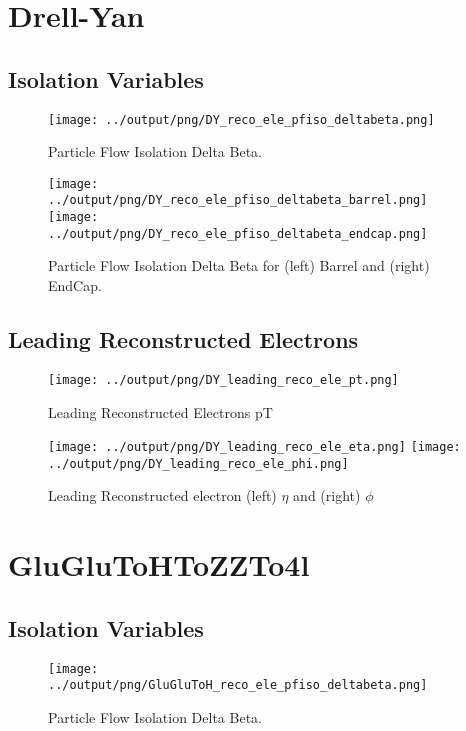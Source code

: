 \documentclass[11pt]{book}
\begin{document}
\clearpage

\chapter{Drell-Yan}
\section{Isolation Variables}
\begin{figure}[ht]
\centering
\texttt{[image: ../output/png/DY\_reco\_ele\_pfiso\_deltabeta.png]}
\caption{Particle Flow Isolation Delta Beta.}
\label{fig:dy_reco_ele_pfiso_deltabeta}
\end{figure}

\begin{figure}[ht]
\centering
\texttt{[image: ../output/png/DY\_reco\_ele\_pfiso\_deltabeta\_barrel.png]}
\texttt{[image: ../output/png/DY\_reco\_ele\_pfiso\_deltabeta\_endcap.png]}
\caption{Particle Flow Isolation Delta Beta for (left) Barrel and (right) EndCap.}
\label{fig:dy_reco_ele_pfiso_deltabeta_regions}
\end{figure}
\clearpage


\section{Leading Reconstructed Electrons}

\begin{figure}[ht]
\centering
\texttt{[image: ../output/png/DY\_leading\_reco\_ele\_pt.png]}
\caption{Leading Reconstructed Electrons pT}
\label{fig:dy_leading_reco_ele_pt}
\end{figure}

\begin{figure}[ht]
\centering
\texttt{[image: ../output/png/DY\_leading\_reco\_ele\_eta.png]}
\texttt{[image: ../output/png/DY\_leading\_reco\_ele\_phi.png]}
\caption{Leading Reconstructed electron (left) $\eta$ and (right) $\phi$}
\label{fig:dy_leading_reco_ele_eta_phi}
\end{figure}
\clearpage

\chapter{GluGluToHToZZTo4l}
\section{Isolation Variables}
\begin{figure}[ht]
\centering
\texttt{[image: ../output/png/GluGluToH\_reco\_ele\_pfiso\_deltabeta.png]}
\caption{Particle Flow Isolation Delta Beta.}
\label{fig:gluglu_reco_ele_pfiso_deltabeta}
\end{figure}
\end{document}
